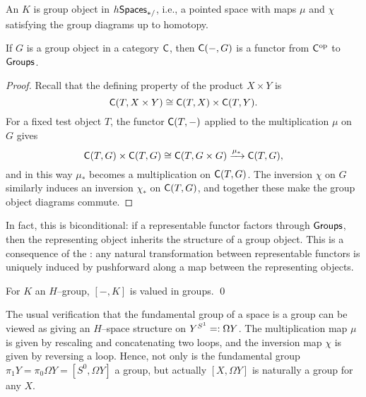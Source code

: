 \begin{definition}
An  $K$ is group object in $h\mathsf{Spaces}_{*/}$, i.e., a pointed space with maps $\mu$ and $\chi$ satisfying the group diagrams up to homotopy.
\end{definition}

\begin{lemma}\label{RepresentableGroupsLemma}
If $G$ is a group object in a category $\mathsf{C}$, then $\mathsf{C}(-, G)$ is a functor from $\mathsf{C}^{\mathrm{op}}$ to $\mathsf{Groups}$.
\end{lemma}
\begin{proof}
Recall that the defining property of the product $X \times Y$ is \[\mathsf{C}(T, X \times Y) \cong \mathsf{C}(T, X) \times \mathsf{C}(T, Y).\]
For a fixed test object $T$, the functor $\mathsf{C}(T, -)$ applied to the multiplication $\mu$ on $G$ gives \[\mathsf{C}(T, G) \times \mathsf{C}(T, G) \cong \mathsf{C}(T, G \times G) \xrightarrow{\mu_*} \mathsf{C}(T, G),\] and in this way $\mu_*$ becomes a multiplication on $\mathsf{C}(T, G)$.
The inversion $\chi$ on $G$ similarly induces an inversion $\chi_*$ on $\mathsf{C}(T, G)$, and together these make the group object diagrams commute.
\end{proof}

\begin{remark}
In fact, this is biconditional: if a representable functor factors through $\mathsf{Groups}$, then the representing object inherits the structure of a group object.
This is a consequence of the : any natural transformation between representable functors is uniquely induced by pushforward along a map between the representing objects.
\end{remark}

\begin{corollary}
For $K$ an $H$--group, $[-, K]$ is valued in groups. \qed
\end{corollary}

\begin{example}
The usual verification that the fundamental group of a space is a group can be viewed as giving an $H$--space structure on $Y^{S^1} =: \Omega Y$.
The multiplication map $\mu$ is given by rescaling and concatenating two loops, and the inversion map $\chi$ is given by reversing a loop.
Hence, not only is the fundamental group $\pi_1 Y = \pi_0 \Omega Y = [S^0, \Omega Y]$ a group, but actually $[X, \Omega Y]$ is naturally a group for any $X$.
\end{example}

